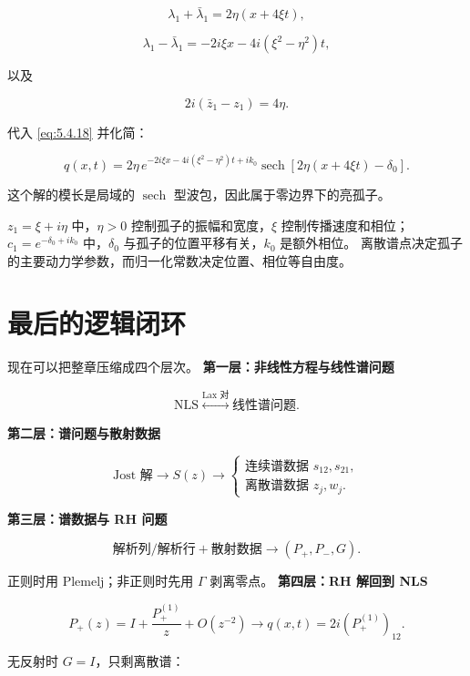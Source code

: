 \documentclass[
    lang=cn,
    scheme=chinese,
    mode=simple,
    device=normal,
    color=blue,
    math=cm,
    thmcnt=section,
    12pt,
    nowatermark
]{elegantbook}
\begin{document}
\[
    \lambda_1+\bar\lambda_1
    =
    2\eta(x+4\xi t),
\]

\[
    \lambda_1-\bar\lambda_1
    =
    -2i\xi x-4i(\xi^2-\eta^2)t,
\]

以及

\[
    2i(\bar z_1-z_1)=4\eta.
\]

代入 \eqref{eq:5.4.18} 并化简：

\[
    \boxed{
        q(x,t)
        =
        2\eta\,
        e^{-2i\xi x-4i(\xi^2-\eta^2)t+ik_0}
        \operatorname{sech}
        \!\left[
            2\eta(x+4\xi t)-\delta_0
            \right].
    }
\]

这个解的模长是局域的 $\operatorname{sech}$ 型波包，因此属于零边界下的亮孤子。

\begin{callout}[参数的直观意义]
    $z_1=\xi+i\eta$ 中，$\eta>0$ 控制孤子的振幅和宽度，$\xi$ 控制传播速度和相位；$c_1=e^{-\delta_0+ik_0}$ 中，$\delta_0$ 与孤子的位置平移有关，$k_0$ 是额外相位。
    离散谱点决定孤子的主要动力学参数，而归一化常数决定位置、相位等自由度。
\end{callout}

\section*{最后的逻辑闭环}

现在可以把整章压缩成四个层次。
\textbf{第一层：非线性方程与线性谱问题}

\[
    \text{NLS}
    \overset{\text{Lax 对}}{\longleftrightarrow}
    \text{线性谱问题}.
\]

\textbf{第二层：谱问题与散射数据}

\[
    \text{Jost 解}
    \longrightarrow
    S(z)
    \longrightarrow
    \begin{cases}
        \text{连续谱数据 }s_{12},s_{21}, \\
        \text{离散谱数据 }z_j,w_j.
    \end{cases}
\]

\textbf{第三层：谱数据与 RH 问题}

\[
    \text{解析列/解析行}
    +
    \text{散射数据}
    \longrightarrow
    (P_+,P_-,G).
\]

正则时用 Plemelj；非正则时先用 $\Gamma$ 剥离零点。
\textbf{第四层：RH 解回到 NLS}

\[
    P_+(z)
    =
    I+\dfrac{P_+^{(1)}}{z}+O(z^{-2})
    \longrightarrow
    q(x,t)=2i(P_+^{(1)})_{12}.
\]

无反射时 $G=I$，只剩离散谱：
\end{document}
